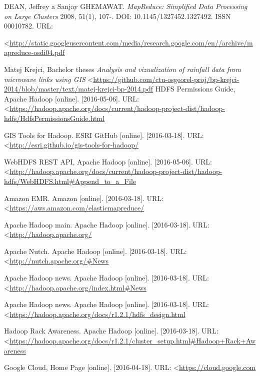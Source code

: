 \documentclass[a4paper,12pt,oneside]{report}
\begin{document}
\begin{thebibliography}{99}
		DEAN, Jeffrey a Sanjay GHEMAWAT. \textit{MapReduce: Simplified Data Processing
			on Large Clusters}  2008, 51(1), 107-. DOI: 10.1145/1327452.1327492. ISSN
		00010782. URL: 
	
\textless\url{http://static.googleusercontent.com/media/research.google.com/en//archive/mapreduce-osdi04.pdf}
		
		Matej Krejci, Bachelor theses \textit{Analysis and vizualization of rainfall
data from microwave links using GIS} 
\textless\url{https://github.com/ctu-osgeorel-proj/bp-krejci-2014/blob/master/text/matej-krejci-bp-2014.pdf}
		HDFS Permissions Guide, Apache Hadoop  [online]. [2016-05-06]. URL: 
\textless\url{https://hadoop.apache.org/docs/current/hadoop-project-dist/hadoop-hdfs/HdfsPermissionsGuide.html}
		
		GIS Tools for Hadoop. ESRI GitHub [online]. [2016-03-18]. URL: 
		\textless\url{http://esri.github.io/gis-tools-for-hadoop/}
		
		WebHDFS REST API, Apache Hadoop  [online]. [2016-05-06]. URL: 
\textless\url{http://hadoop.apache.org/docs/current/hadoop-project-dist/hadoop-hdfs/WebHDFS.html#Append_to_a_File
		}
		
		Amazon EMR. Amazon [online]. [2016-03-18]. 
		URL: \textless\url{https://aws.amazon.com/elasticmapreduce/}
		
		Apache Hadoop main. Apache Hadoop [online]. [2016-03-18]. 
		URL: \textless\url{http://hadoop.apache.org/}
		
		Apache Nutch. Apache Hadoop [online]. [2016-03-18]. 
		URL: \textless\url{http://nutch.apache.org/#News
		}
		
		Apache Hadoop news. Apache Hadoop [online]. [2016-03-18]. 
		URL: \textless\url{http://hadoop.apache.org/index.html#News}
		
		
		Apache Hadoop news. Apache Hadoop [online]. [2016-03-18]. 
		URL: \textless\url{https://hadoop.apache.org/docs/r1.2.1/hdfs_design.html}
		
		
		Hadoop Rack Awareness. Apache Hadoop [online]. [2016-03-18]. 
		URL:
\textless\url{https://hadoop.apache.org/docs/r1.2.1/cluster_setup.html#Hadoop+Rack+Awareness}
		
		Google Cloud, Home Page [online]. [2016-04-18]. 
		URL: \textless\url{https://cloud.google.com}
		

\end{thebibliography}
\end{document}
